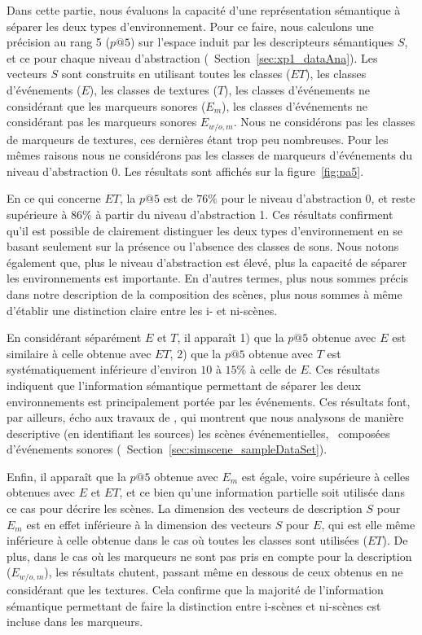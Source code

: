 \documentclass[twoside,twocolumn]{article}
\begin{document}
Dans cette partie, nous évaluons la capacité d'une représentation sémantique à séparer les deux types d'environnement. Pour ce faire, nous calculons une précision au rang 5 ($p@5$) sur l'espace induit par les descripteurs sémantiques $S$, et ce pour chaque niveau d'abstraction (\cf~Section~\ref{sec:xp1_dataAna}). Les vecteurs $S$ sont construits en utilisant toutes les classes ($ET$), les classes d'événements ($E$), les classes de textures ($T$), les classes d'événements ne considérant que les marqueurs sonores ($E_m$), les classes d'événements ne considérant pas les marqueurs sonores $E_{w/o,m}$. Nous ne considérons pas les classes de marqueurs de textures, ces dernières étant trop peu nombreuses. Pour les mêmes raisons nous ne considérons pas les classes de marqueurs d'événements du niveau d'abstraction $0$. Les résultats sont affichés sur la figure~\ref{fig:pa5}.

En ce qui concerne $ET$, la $p@5$ est de $76\%$ pour le niveau d'abstraction 0, et reste supérieure à $86\%$ à partir du niveau d'abstraction 1. Ces résultats confirment qu'il est possible de clairement distinguer les deux types d'environnement en se basant seulement sur la présence ou l'absence des classes de sons. Nous notons également que, plus le niveau d'abstraction est élevé, plus la capacité de séparer les environnements est importante. En d'autres termes, plus nous sommes précis dans notre description de la composition des scènes, plus nous sommes à même d'établir une distinction claire entre les i- et ni-scènes.

En considérant séparément $E$ et $T$, il apparaît 1) que la $p@5$ obtenue avec $E$ est similaire à celle obtenue avec $ET$, 2) que la $p@5$ obtenue avec $T$ est systématiquement inférieure d'environ $10$ à $15\%$ à celle de $E$. Ces résultats indiquent que l'information sémantique permettant de séparer les deux environnements est principalement portée par les événements. Ces résultats font, par ailleurs, écho aux travaux de  \cite{maffiolo_caracterisation_1999}, qui montrent que nous analysons de manière descriptive (en identifiant les sources) les scènes événementielles, \ie~composées d'événements sonores (\cf~Section~\ref{sec:simscene_sampleDataSet}).

Enfin, il apparaît que la $p@5$ obtenue avec $E_{m}$ est égale, voire supérieure à celles obtenues avec $E$ et $ET$, et ce bien qu'une information partielle soit utilisée dans ce cas pour décrire les scènes. La dimension des vecteurs de description $S$ pour $E_m$ est en effet inférieure à la dimension des vecteurs $S$ pour $E$, qui est elle même inférieure à celle obtenue dans le cas où toutes les classes sont utilisées ($ET$). De plus, dans le cas où les marqueurs ne sont pas pris en compte pour la description ($E_{w/o,m}$), les résultats chutent, passant même en dessous de ceux obtenus en ne considérant que les textures. Cela confirme que la majorité de l'information sémantique permettant de faire la distinction entre i-scènes et ni-scènes est incluse dans les marqueurs.
\end{document}
